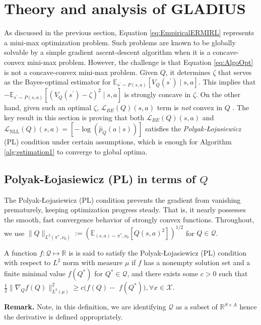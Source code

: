 
\section{Theory and analysis of GLADIUS}\label{sec:Analysis}
As discussed in the previous section, Equation \eqref{eq:EmpiricalERMIRL} represents a mini-max optimization problem. 
Such problems are known to be globally solvable by a simple gradient ascent-descent algorithm when it is a concave-convex mini-max problem. 
However, the challenge is that Equation \eqref{eq:AlgoOpt} is not a concave-convex mini-max problem. 
Given $Q$, it determines $\zeta$ that serves as the Bayes-optimal estimator for $\mathbb{E}_{s^{\prime} \sim P(s, a)}\left[V_Q\left(s^{\prime}\right) \mid s, a\right]$. 
This implies that $-\mathbb{E}_{s^{\prime} \sim P(s, a)}\left[\left(V_Q\left(s^{\prime}\right)-\zeta\right)^2 \mid s, a\right]$ is strongly concave in $\zeta$. 
On the other hand, given such an optimal $\zeta$, $\mathcal{L}_{BE}(Q)(s,a)$ term is \textit{not} convex in $Q$ \cite{bas2021logistic}. The key result in this section is proving that both $\mathcal{L}_{BE}(Q)(s,a)$ and $\mathcal{L}_{\mathrm{NLL}}(Q)(s,a)= \left[-\log\left(\hat{p}_{Q}(a
    \mid s)\right)\right]$ satisfies the \textit{Polyak-Łojasiewicz} (PL) condition under certain assumptions, which is enough for Algorithm \ref{alg:estimation1} to converge to global optima.



\subsection{Polyak-Łojasiewicz (PL) in terms of $Q$}

 The Polyak-Łojasiewicz (PL) condition prevents the gradient from vanishing prematurely, keeping optimization progress steady. That is, it nearly possesses the smooth, fast convergence behavior of strongly convex functions. Throughout, we use $\|Q\|_{L^2\left(\pi^*, \nu_0\right)}:=\left(\mathbb{E}_{(s, a) \sim \pi^*, \nu_0}\left[Q(s, a)^2\right]\right)^{1 / 2}$ for $Q\in\mathcal{Q}$. 
    

\begin{defn} 
     A function $f:\mathcal{\mathcal{Q}}\mapsto \mathbb{R}$ is is said to satisfy the Polyak-Łojasiewicz (PL) condition with respect to $L^2$ norm with measure $\mu$ if $f$ has a nonempty solution set and a finite minimal value $f(Q^\ast)$ for $Q^\ast\in\mathcal{Q}$, and there exists some $c>0$ such that $\frac{1}{2}\|\nabla_Q f(Q)\|^2_{L^2(\mu)} \geq  c(f(Q)-$ $f(Q^\ast)), \forall x\in\mathcal{X}$.
\end{defn}
\textbf{Remark.} Note, in this definition, we are identifying $\mathcal{Q}$ as a subset of $\mathbb{R}^{S\times A}$ hence the derivative is defined appropriately.

